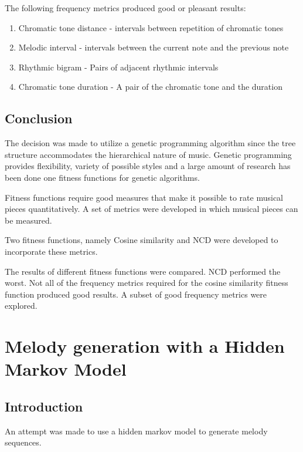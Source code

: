 The following frequency metrics produced good or pleasant results:
\begin{enumerate}
\item Chromatic tone distance - intervals between repetition of chromatic tones
\item Melodic interval - intervals between the current note and the previous note
\item Rhythmic bigram - Pairs of adjacent rhythmic intervals
\item Chromatic tone duration - A pair of the chromatic tone and the duration
\end{enumerate}


\section{Conclusion}

The decision was made to utilize a genetic programming algorithm since the tree structure accommodates the hierarchical nature of music. Genetic programming provides flexibility, variety of possible styles and a large amount of research has been done one fitness functions for genetic algorithms.

Fitness functions require good measures that make it possible to rate musical pieces quantitatively. A set of metrics were developed in which musical pieces can be measured.

Two fitness functions, namely Cosine similarity and \ac{NCD} were developed to incorporate these metrics.

The results of different fitness functions were compared. \ac{NCD} performed the worst. Not all of the frequency metrics required for the cosine similarity fitness function produced good results. A subset of good frequency metrics were explored.





\chapter{Melody generation with a Hidden Markov Model}
\section{Introduction}
An attempt was made to use a hidden markov model to generate melody sequences.

